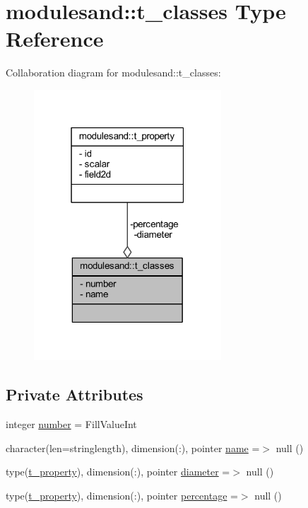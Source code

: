 \hypertarget{structmodulesand_1_1t__classes}{}\section{modulesand\+:\+:t\+\_\+classes Type Reference}
\label{structmodulesand_1_1t__classes}


Collaboration diagram for modulesand\+:\+:t\+\_\+classes\+:\nopagebreak
\begin{figure}[H]
\begin{center}
\leavevmode
\includegraphics[width=199pt]{structmodulesand_1_1t__classes__coll__graph}
\end{center}
\end{figure}
\subsection*{Private Attributes}
\begin{DoxyCompactItemize}
\item 
integer \mbox{\hyperlink{structmodulesand_1_1t__classes_a8f733e02eb500a2728ce1cdcb05e8823}{number}} = Fill\+Value\+Int
\item 
character(len=stringlength), dimension(\+:), pointer \mbox{\hyperlink{structmodulesand_1_1t__classes_a6d6477e925767d55d8a1cd464d266bf4}{name}} =$>$ null ()
\item 
type(\mbox{\hyperlink{structmodulesand_1_1t__property}{t\+\_\+property}}), dimension(\+:), pointer \mbox{\hyperlink{structmodulesand_1_1t__classes_a3d5976cb0c73b85f0eb74108731b0e23}{diameter}} =$>$ null ()
\item 
type(\mbox{\hyperlink{structmodulesand_1_1t__property}{t\+\_\+property}}), dimension(\+:), pointer \mbox{\hyperlink{structmodulesand_1_1t__classes_aee41724045a0d3a8fff3b4cdd74c4123}{percentage}} =$>$ null ()
\end{DoxyCompactItemize}


